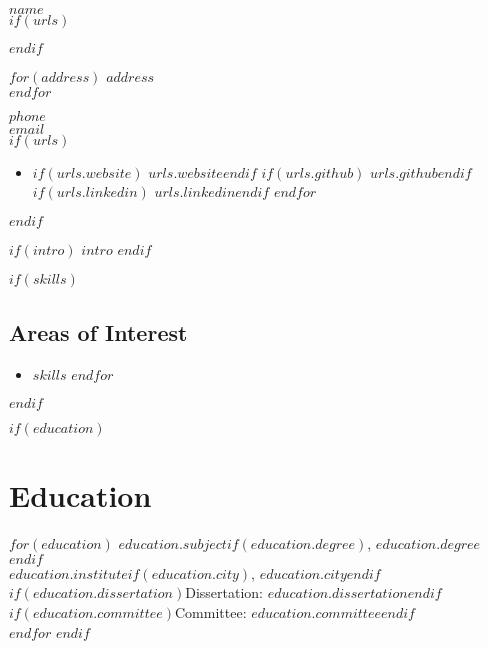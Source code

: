 \documentclass[$fontsize$, a4paper]{article}
\newcommand{\note}[1]{\marginnote{\small #1}}
\begin{document}
{\LARGE $name$}\\[.2cm]

$if(urls)$
\begin{multicols}{2}
$endif$

$for(address)$
$address$\\
$endfor$

\vspace{-10pt}

$phone$\\
\href{mailto:$email$}{$email$}\\


$if(urls)$
\columnbreak

\begin{itemize}[label=]
$for(urls)$
\item $if(urls.website)$ \href{http://$urls.website$}{$urls.website$}$endif$
      $if(urls.github)$ \href{http://github.com/$urls.github$}{$urls.github$}$endif$
      $if(urls.linkedin)$ \href{http://linkedin.com/in/$urls.linkedin$}{$urls.linkedin$}$endif$
$endfor$
\end{itemize}
\end{multicols}
$endif$

\vspace{.2cm}

$if(intro)$
$intro$
$endif$

$if(skills)$
\subsection*{Areas of Interest}
\begin{itemize}
    $for(skills)$
      \item $skills$
    $endfor$
\end{itemize}
\vspace{.2cm}
$endif$

$if(education)$
\section*{Education}
\noindent
$for(education)$
\note{$education.year$}\textbf{$education.subject$}$if(education.degree)$, $education.degree$$endif$\\
\emph{$education.institute$}$if(education.city)$, $education.city$$endif$\\
$if(education.dissertation)$Dissertation: $education.dissertation$$endif$\\
$if(education.committee)$Committee: $education.committee$$endif$\\[.2cm]
$endfor$
$endif$
\end{document}
